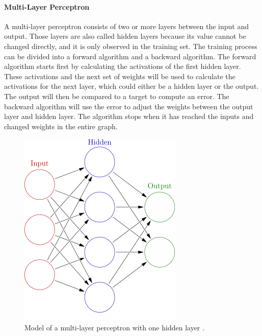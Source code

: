 \documentclass[USenglish]{ifimaster}  %
\begin{document}
\paragraph{Multi-Layer Perceptron}
A multi-layer perceptron consists of two or more layers between the input and output. Those layers are also called hidden layers because its value cannot be changed directly, and it is only observed in the training set. The training process can be divided into a forward algorithm and a backward algorithm. The forward algorithm starts first by calculating the activations of the first hidden layer. These activations and the next set of weights will be used to calculate the activations for the next layer, which could either be a hidden layer or the output. The output will then be compared to a target to compute an error. The backward algorithm will use the error to adjust the weights between the output layer and hidden layer. The algorithm stops when it has reached the inputs and changed weights in the entire graph. 
	
	
\begin{figure}[h]
	\centering
	\includegraphics[scale=0.6]{Figures/MLP.png}
	\caption[Model of a multi-layer perceptron]{Model of a multi-layer perceptron with one hidden layer \cite{MLP}.}
	\label{fig:MLP}
\end{figure}
	
\end{document}
